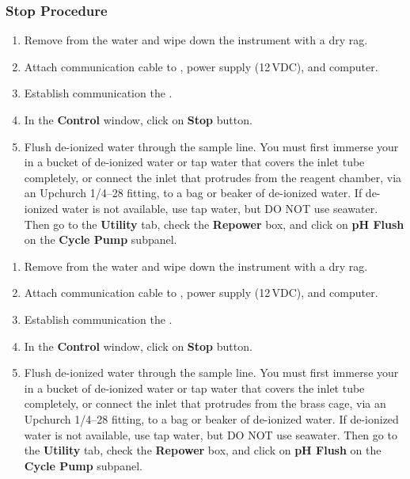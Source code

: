 \or			%

\fi


\subsubsection{\instType{} Stop Procedure}

\ifcase \inst	%

\begin{enumerate}
    \item Remove \instType{} from the water and wipe down the instrument with a dry rag.
    
    \item Attach communication cable to \instType{}, power supply (12\,VDC), and computer.
    
    \item Establish communication the \instType{}.
    
    \item In the \textbf{Control} window, click on \textbf{Stop} button.
    
    \item {\color{red} Flush de-ionized water through the sample line.  You must first immerse your \instType{} in a bucket of de-ionized water or tap water that covers the inlet tube completely, or connect the inlet that protrudes from the reagent chamber, via an Upchurch 1/4--28 fitting, to a bag or beaker of de-ionized water.  If de-ionized water is not available, use tap water, but DO NOT use seawater.  Then go to the \textbf{Utility} tab, check the \textbf{Repower} box, and click on \textbf{pH Flush} on the \textbf{Cycle Pump} subpanel.}
\end{enumerate}

\or	 		%

\begin{enumerate}
    \item Remove \instType{} from the water and wipe down the instrument with a dry rag.
    
    \item Attach communication cable to \instType{}, power supply (12\,VDC), and computer.
    
    \item Establish communication the \instType{}.
    
    \item In the \textbf{Control} window, click on \textbf{Stop} button.
    
    \item {\color{red} Flush de-ionized water through the sample line.  You must first immerse your \instType{} in a bucket of de-ionized water or tap water that covers the inlet tube completely, or connect the inlet that protrudes from the brass cage, via an Upchurch 1/4--28 fitting, to a bag or beaker of de-ionized water.  If de-ionized water is not available, use tap water, but DO NOT use seawater.  Then go to the \textbf{Utility} tab, check the \textbf{Repower} box, and click on \textbf{pH Flush} on the \textbf{Cycle Pump} subpanel.}
\end{enumerate}

